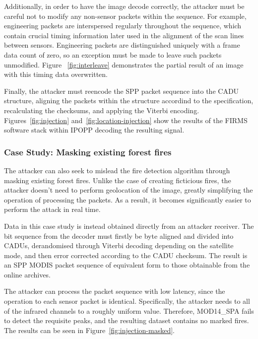 Additionally, in order to have the image decode correctly, the attacker must be careful not to modify any non-sensor packets within the sequence.
For example, engineering packets are interspersed regularly throughout the sequence, which contain crucial timing information later used in the alignment of the scan lines between sensors.
Engineering packets are distinguished uniquely with a frame data count of zero, so an exception must be made to leave such packets unmodified.
Figure ~\ref{fig:interleave} demonstrates the partial result of an image with this timing data overwritten.

Finally, the attacker must reencode the SPP packet sequence into the CADU structure, aligning the packets within the structure accordind to the specification, recalculating the checksums, and applying the Viterbi encoding.
Figures~\ref{fig:injection} and~\ref{fig:location-injection} show the results of the FIRMS software stack within IPOPP decoding the resulting signal.



\subsubsection{Case Study: Masking existing forest fires}

The attacker can also seek to mislead the fire detection algorithm through masking existing forest fires.
Unlike the case of creating ficticious fires, the attacker doesn't need to perform geolocation of the image, greatly simplifying the operation of processing the packets.
As a result, it becomes significantly easier to perform the attack in real time.

Data in this case study is instead obtained directly from an attacker receiver.
The bit sequence from the decoder must firstly be byte aligned and divided into CADUs, derandomised through Viterbi decoding depending on the satellite mode, and then error corrected according to the CADU checksum.
The result is an SPP MODIS packet sequence of equivalent form to those obtainable from the online archives.

The attacker can process the packet sequence with low latency, since the operation to each sensor packet is identical.
Specifically, the attacker needs to all of the infrared channels to a roughly uniform value.
Therefore, MOD14\_SPA fails to detect the requisite peaks, and the resulting dataset contains no marked fires.
The results can be seen in Figure~\ref{fig:injection-masked}.

